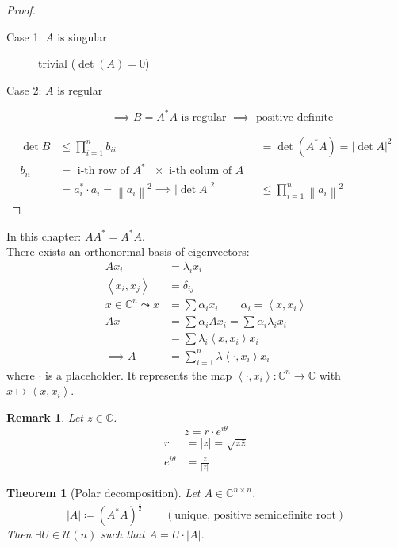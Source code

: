 \documentclass{article}
\newcounter{lecref}[section]
\numberwithin{lecref}{section}
\newtheorem{theorem}[lecref]{Theorem}
\newtheorem{remark}[lecref]{Remark}
\newcommand{\angel}[1]{\left\langle#1\right\rangle}
\newcommand{\norm}[1]{\left\|#1\right\|}
\newcommand{\card}[1]{\left|#1\right|}
\begin{document}
\begin{proof}
  \begin{description}
    \item[Case 1: $A$ is singular]
      trivial ($\det(A) = 0$)
    \item[Case 2: $A$ is regular]
      \[ \implies B = A^* A \text{ is regular } \implies \text{ positive definite} \]
  \end{description}
  \begin{align*}
    \det{B} &\leq \prod_{i=1}^n b_{ii}
            &= \det(A^* A) = \card{\det{A}}^2 \\
    b_{ii}  &= \text{ i-th row of $A^*$ } \times \text{ i-th colum of $A$ } \\
            &= a_i^* \cdot a_i = \norm{a_i}^2
    \implies \card{\det{A}}^2 &\leq \prod_{i=1}^n \norm{a_i}^2
  \end{align*}
\end{proof}

In this chapter: $AA^* = A^* A$. \\
There exists an orthonormal basis of eigenvectors:
\begin{align*}
  Ax_i &= \lambda_i x_i \\
  \angel{x_i, x_j} &= \delta_{ij} \\
  x \in \mathbb C^n \leadsto x &= \sum \alpha_i x_i \qquad \alpha_i = \angel{x, x_i} \\
  Ax &= \sum \alpha_i Ax_i = \sum \alpha_i \lambda_i x_i \\
    &= \sum \lambda_i \angel{x, x_i} x_i \\
  \implies A &= \sum_{i=1}^n \lambda \angel{\cdot, x_i} x_i
\end{align*}
where $\cdot$ is a placeholder. It represents the map $\angel{\cdot, x_i}: \mathbb C^n \to \mathbb C$ with $x \mapsto \angel{x, x_i}$.

\begin{remark}
  Let $z \in \mathbb C$.
  \[ z = r \cdot e^{i \theta} \]
  \begin{align*}
    r &= \card{z} = \sqrt{z \overline{z}} \\
    e^{i \theta} &= \frac{z}{\card{z}}
  \end{align*}
\end{remark}

\begin{theorem}[Polar decomposition] %
  Let $A \in \mathbb C^{n \times n}$.
  \[ \card{A} \coloneqq (A^* A)^{\frac12} \qquad (\text{unique, positive semidefinite root}) \]
  Then $\exists U \in \mathcal U(n)$ such that $A = U \cdot \card{A}$.
\end{theorem}
\end{document}
